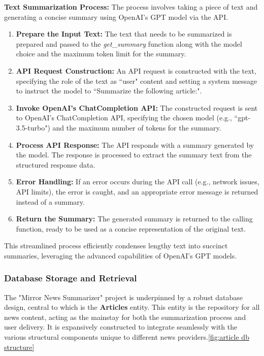\documentclass[10pt]{article}
\begin{document}
\newpage
\textbf{Text Summarization Process:}
The process involves taking a piece of text and generating a concise summary using OpenAI's GPT model via the API. 

\begin{enumerate}
    \item \textbf{Prepare the Input Text:} The text that needs to be summarized is prepared and passed to the \textit{get\_summary} function along with the model choice and the maximum token limit for the summary.
    
    \item \textbf{API Request Construction:} An API request is constructed with the text, specifying the role of the text as ``user" content and setting a system message to instruct the model to ``Summarize the following article:".
    
    \item \textbf{Invoke OpenAI's ChatCompletion API:} The constructed request is sent to OpenAI's ChatCompletion API, specifying the chosen model (e.g., ``gpt-3.5-turbo") and the maximum number of tokens for the summary.
    
    \item \textbf{Process API Response:} The API responds with a summary generated by the model. The response is processed to extract the summary text from the structured response data.
    
    \item \textbf{Error Handling:} If an error occurs during the API call (e.g., network issues, API limits), the error is caught, and an appropriate error message is returned instead of a summary.
    
    \item \textbf{Return the Summary:} The generated summary is returned to the calling function, ready to be used as a concise representation of the original text.
\end{enumerate}

This streamlined process efficiently condenses lengthy text into succinct summaries, leveraging the advanced capabilities of OpenAI's GPT models.

\subsubsection{Database Storage and Retrieval}

The "Mirror News Summarizer" project is underpinned by a robust database design, central to which is the \textbf{Articles} entity. This entity is the repository for all news content, acting as the mainstay for both the summarization process and user delivery. It is expansively constructed to integrate seamlessly with the various structural components unique to different news providers.\ref{fig:article db structure}
\end{document}
